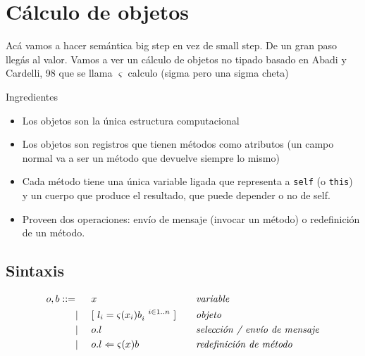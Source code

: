 \documentclass{report}
\theoremstyle{definition} %
\newcommand{\iesimo}[1]{#1_i^{\ \ i \in 1..n}}
\newcommand{\select}[1]{\textcolor{Blue}{#1}}
\begin{document}
\newcommand{\sabs}[2]{\lambda(#1) #2} %
\newcommand{\sapp}[2]{#1(#2)} %
\newcommand{\scall}[3]{\sel{#1}{\sapp{#2}{#3}}}

\newcommand{\sfv}[1]{\text{fv}(#1)}
\newcommand{\ssust}[3]{#1 \select{\{#2 / #3\}}} %

\newcommand{\attrLi}{\attr{l_i}{\met{x_i}{\iesimo{b}}}}

\newcommand{\sderiv}[3]{\trfrac[{[}#1{]}]{#2}{#3}}
\newcommand{\bigreduces}{\longrightarrow}
\newcommand{\bigreduce}[2]{#1 \bigreduces #2}

\newcommand{\ubrace}[2]{\aunderbrace[l1r]{#1}_{#2}}
\newcommand{\obrace}[2]{\aoverbrace[L1R]{#1}^{#2}}

\section{Cálculo de objetos}

Acá vamos a hacer semántica big step en vez de small step. De un gran paso
llegás al valor. Vamos a ver un cálculo de objetos no tipado basado en Abadi y
Cardelli, 98 que se llama $\varsigma$ calculo (sigma pero una sigma cheta)

Ingredientes

\begin{itemize}
    \item Los objetos son la única estructura computacional
    \item Los objetos son registros que tienen métodos como atributos (un campo
    normal va a ser un método que devuelve siempre lo mismo)
    \item Cada método tiene una única variable ligada que representa a
    \texttt{self} (o \texttt{this}) y un cuerpo que produce el resultado, que
    puede depender o no de self.
    \item Proveen dos operaciones: envío de mensaje (invocar un método) o
    redefinición de un método.
\end{itemize}

\subsection{Sintaxis}

\begin{alignat*}{3}
    o, b ::=
    &  &&x  &&\text{\textit{variable}}\\
    &|\ &&\obj{\attr{l_i}{\met{x_i}{\iesimo{b}}}} 
    \quad&&\text{\textit{objeto}}\\
    &| &&\sel{o}{l} &&\text{\textit{selección / envío de mensaje}}\\
    &| &&\update{o}{l}{\met{x}{b}} &&\text{\textit{redefinición de método}}\\
\end{alignat*}
\end{document}
